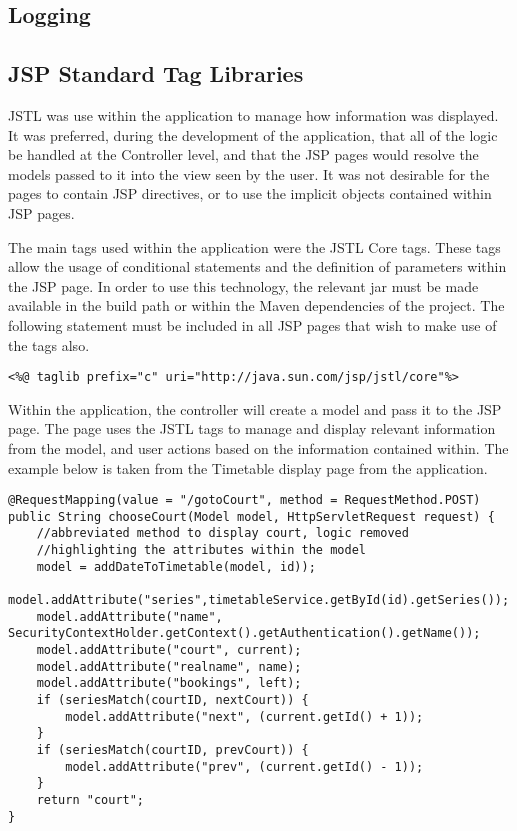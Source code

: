 \subsection{Logging}

\subsection{JSP Standard Tag Libraries}

JSTL was use within the application to manage how information was displayed. It was preferred, during the development of the application, that all of the logic be handled at the Controller level, and that the JSP pages would resolve the models passed to it into the view seen by the user. It was not desirable for the pages to contain JSP directives, or to use the implicit objects contained within JSP pages. 

The main tags used within the application were the JSTL Core tags.  These tags allow the usage of conditional statements and the definition of parameters within the JSP page. In order to use this technology, the relevant jar must be made available in the build path or within the Maven dependencies of the project. The following statement must be included in all JSP pages that wish to make use of the tags also.\newline

\begin{lstlisting}
<%@ taglib prefix="c" uri="http://java.sun.com/jsp/jstl/core"%>
\end{lstlisting}

Within the application, the controller will create a model and pass it to the JSP page. The page uses the JSTL tags to manage and display relevant information from the model, and user actions based on the information contained within. The example below is taken from the Timetable display page from the application.\newline

\begin{lstlisting}
@RequestMapping(value = "/gotoCourt", method = RequestMethod.POST)
public String chooseCourt(Model model, HttpServletRequest request) {
	//abbreviated method to display court, logic removed
	//highlighting the attributes within the model
	model = addDateToTimetable(model, id));
	model.addAttribute("series",timetableService.getById(id).getSeries());
	model.addAttribute("name", SecurityContextHolder.getContext().getAuthentication().getName());
	model.addAttribute("court", current);
	model.addAttribute("realname", name);
	model.addAttribute("bookings", left);
	if (seriesMatch(courtID, nextCourt)) {
		model.addAttribute("next", (current.getId() + 1));
	}
	if (seriesMatch(courtID, prevCourt)) {
		model.addAttribute("prev", (current.getId() - 1));
	}
	return "court";
}
\end{lstlisting}	

